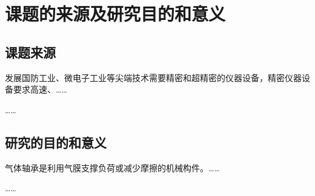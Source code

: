 
\chapter{课题的来源及研究目的和意义}

\section{课题来源}

发展国防工业、微电子工业等尖端技术需要精密和超精密的仪器设备，精密仪器设备要求高速、\dots\dots

\dots\dots

\section{研究的目的和意义}

气体轴承是利用气膜支撑负荷或减少摩擦的机械构件。\dots\dots

\dots\dots